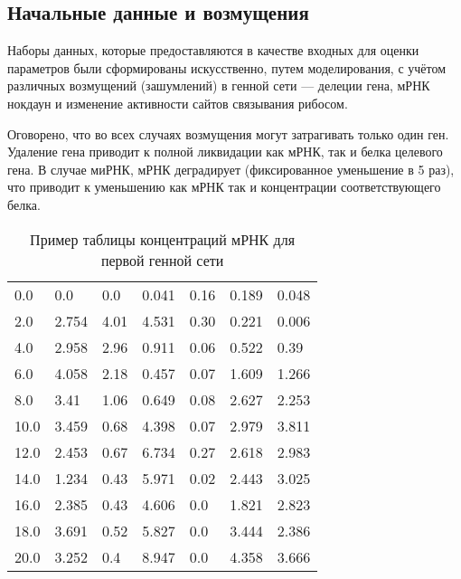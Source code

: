 \subsection{Начальные данные и возмущения} \label{s2_4}

Наборы данных, которые предоставляются в качестве входных для оценки параметров 
были сформированы искусственно, путем моделирования, с учётом различных 
возмущений (зашумлений) в генной сети — делеции гена, мРНК нокдаун и изменение 
активности сайтов связывания рибосом. 

Оговорено, что во всех случаях возмущения могут затрагивать только один ген. 
Удаление гена приводит к полной ликвидации как мРНК, так и белка целевого гена. 
В случае миРНК, мРНК деградирует (фиксированное уменьшение в 5 раз), что 
приводит к уменьшению как мРНК так и концентрации соответствующего белка.

\begin{table}[h]
  \centering
    \begin{tabular}{l|llllll}
        0.0	  & 0.0    & 0.0   & 0.041  & 0.16  & 0.189  & 0.048 \\
        2.0	  & 2.754  & 4.01  & 4.531  & 0.30  & 0.221  & 0.006 \\
        4.0	  & 2.958  & 2.96  & 0.911  & 0.06  & 0.522  & 0.39  \\
        6.0	  & 4.058  & 2.18  & 0.457  & 0.07  & 1.609  & 1.266 \\
        8.0	  & 3.41   & 1.06  & 0.649  & 0.08  & 2.627  & 2.253 \\
        10.0  & 3.459  & 0.68  & 4.398  & 0.07  & 2.979  & 3.811 \\
        12.0  & 2.453  & 0.67  & 6.734  & 0.27  & 2.618  & 2.983 \\
        14.0  & 1.234  & 0.43  & 5.971  & 0.02  & 2.443  & 3.025 \\
        16.0  & 2.385  & 0.43  & 4.606  & 0.0   & 1.821  & 2.823 \\
        18.0  & 3.691  & 0.52  & 5.827  & 0.0   & 3.444  & 2.386 \\
        20.0  & 3.252  & 0.4   & 8.947  & 0.0   & 4.358  & 3.666 
    \end{tabular}
  \caption{Пример таблицы концентраций мРНК для первой генной сети}
  \label{mRNAtable}
\end{table}

